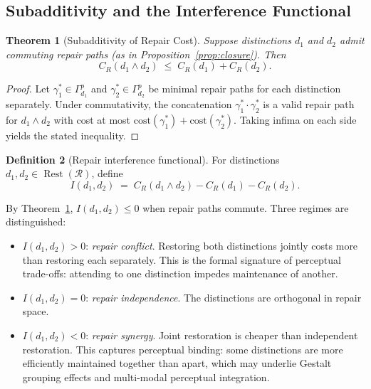 \documentclass[12pt, oneside]{article}
\theoremstyle{plain}
\newtheorem{theorem}{Theorem}[section]
\theoremstyle{definition}
\newtheorem{definition}[theorem]{Definition}
\theoremstyle{remark}
\theoremstyle{definition}
\DeclareMathOperator{\Rest}{Rest}
\newcommand{\CR}{C_{\!R}}
\begin{document}
\subsection{Subadditivity and the Interference Functional}

\begin{theorem}[Subadditivity of Repair Cost]
  Suppose distinctions $d_1$ and $d_2$ admit commuting repair paths
  (as in Proposition~\ref{prop:closure}).
  Then
  \[
    \CR(d_1 \wedge d_2)
    \;\leq\;
    \CR(d_1) + \CR(d_2).
  \]
  \label{thm:subadditive}
\end{theorem}

\begin{proof}
  Let $\gamma_1^* \in \Gamma_{d_1}^p$ and $\gamma_2^* \in
  \Gamma_{d_2}^p$ be minimal repair paths for each distinction
  separately.
  Under commutativity, the concatenation
  $\gamma_1^* \cdot \gamma_2^*$ is a valid repair path for
  $d_1 \wedge d_2$ with cost at most
  $\mathrm{cost}(\gamma_1^*) + \mathrm{cost}(\gamma_2^*)$.
  Taking infima on each side yields the stated inequality.
\end{proof}

\begin{definition}[Repair interference functional]
  For distinctions $d_1, d_2 \in \Rest(\mathcal{R})$, define
  \[
    I(d_1, d_2)
    \;=\;
    \CR(d_1 \wedge d_2) - \CR(d_1) - \CR(d_2).
  \]
  \label{def:interference}
\end{definition}

By Theorem~\ref{thm:subadditive}, $I(d_1, d_2) \leq 0$ when repair
paths commute.
Three regimes are distinguished:

\begin{itemize}
  \item $I(d_1, d_2) > 0$: \emph{repair conflict}.
    Restoring both distinctions jointly costs more than restoring
    each separately.
    This is the formal signature of perceptual trade-offs:
    attending to one distinction impedes maintenance of another.

  \item $I(d_1, d_2) = 0$: \emph{repair independence}.
    The distinctions are orthogonal in repair space.

  \item $I(d_1, d_2) < 0$: \emph{repair synergy}.
    Joint restoration is cheaper than independent restoration.
    This captures perceptual binding: some distinctions are
    more efficiently maintained together than apart, which
    may underlie Gestalt grouping effects and multi-modal
    perceptual integration.
\end{itemize}
\end{document}
